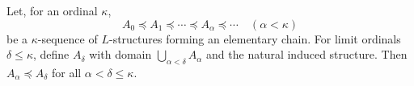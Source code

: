 Let, for an ordinal $\kappa$,
$$A_0 \preceq A_1 \preceq \cdots \preceq A_\alpha \preceq \cdots \quad (\alpha < \kappa)$$
be a $\kappa$-sequence of $L$-structures forming an elementary chain. For limit ordinals $\delta \leq \kappa$, define $A_\delta$ with domain $\bigcup_{\alpha < \delta} A_\alpha$ and the natural induced structure. Then $A_\alpha \preceq A_\delta$ for all $\alpha < \delta \leq \kappa$.
